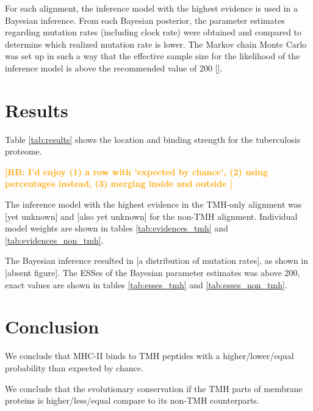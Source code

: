 \documentclass{article}
\newcommand{\richel}[1]{\textcolor{orange}{\textbf{[RB: #1]}}}
\begin{document}
For each alignment, the inference model with the highest evidence
is used in a Bayesian inference. From each Bayesian posterior,
the parameter estimates regarding mutation rates (including clock rate)
were obtained and compared to determine which realized mutation rate is lower.
The Markov chain Monte Carlo was set up in such a way that the effective sample
size for the likelihood of the inference model is above the recommended value
of 200 [\cite{bouckaert2014beast}].

\section{Results}

Table \ref{tab:results} shows the location and binding strength for the
tuberculosis proteome.


\richel{
  I'd enjoy 
  (1) a row with 'expected by chance', 
  (2) using percentages instead,
  (3) merging inside and outside
}

The inference model with the highest evidence in the
TMH-only alignment was [yet unknown] and [also yet unknown]
for the non-TMH alignment. Individual model weights are shown
in tables \ref{tab:evidences_tmh} 
and \ref{tab:evidences_non_tmh}.

The Bayesian inference resulted in [a distribution of mutation rates],
as shown in [absent figure].
The ESSes of the Bayesian parameter estimates was above 200, exact values
are shown in tables \ref{tab:esses_tmh} and \ref{tab:esses_non_tmh}.

\section{Conclusion}

We conclude that MHC-II binds to TMH peptides with a higher/lower/equal
probability than expected by chance. 

We conclude that the evolutionary conservation if the TMH parts of membrane
proteins is higher/less/equal compare to its non-TMH counterparts.

\end{document}
